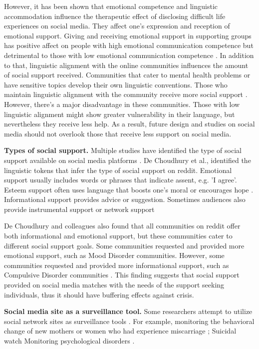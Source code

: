 However, it has been shown that emotional competence and linguistic accommodation influence the therapeutic effect of disclosing difficult life experiences on social media. They affect one's expression and reception of emotional support. Giving and receiving emotional support in supporting groups has positive affect on people with high emotional communication competence but detrimental to those with low emotional communication competence \cite{yoo2014giving}. In addition to that, linguistic alignment with the online communities influences the amount of social support received. Communities that cater to mental health problems or have sensitive topics develop their own linguistic conventions. Those who maintain linguistic alignment with the community receive more social support \cite{Sharma2018support}. However, there's a major disadvantage in these communities. Those with low linguistic alignment might show greater vulnerability in their language, but nevertheless they receive less help. As a result, future design and studies on social media should not overlook those that receive less support on social media.

\textbf{Types of social support.} Multiple studies have identified the type of social support available on social media platforms \cite{yoo2014giving}. De Choudhury et al.,
\citet{Sharma2018support} identified the linguistic tokens that infer the type of social support on reddit. Emotional support usually includes words or phrases that indicate assent, e.g. 'I agree'. Esteem support often uses language that boosts one's moral or encourages hope \cite{Sharma2018support}. Informational support provides advice or suggestion. Sometimes audiences also provide instrumental support or network support \cite{de2017language}

 De Choudhury and colleagues also found that all communities on reddit offer both informational and emotional support, but these communities cater to different social support goals. Some communities requested and provided more emotional support, such as Mood Disorder communities. However, some communities requested and provided more informational support, such as Compulsive Disorder communities \cite{Sharma2018support}. This finding suggests that social support provided on social media matches with the needs of the support seeking individuals, thus it should have buffering effects against crisis.

\textbf{Social media site as a surveillance tool.} Some researchers attempt to utilize social network sites as surveillance tools \cite{reece2017forecasting}. For example, monitoring the behavioral change of new mothers \cite{de_choudhury_major_2013} or women who had experience miscarriage \cite{andalibi_social_2016}; Suicidal watch \cite{de2017language, de2016discovering} Monitoring psychological disorders \cite{andalibi_sensitive_2017,de2013predicting}.

